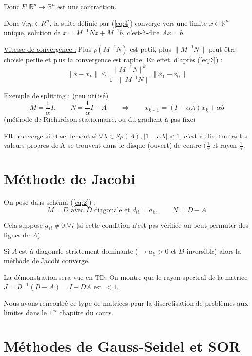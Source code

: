 \documentclass[a4paper,11pt]{article}
\newcommand{\R}{\mathbb{R}}
\theoremstyle{plain} %
\begin{document}
Donc $F : \R^n \rightarrow \R^n$ est une contraction.

Donc $\forall x_0 \in R^n$, la suite définie par (\ref{eq:4}) converge vers une limite $x \in \R^n$ unique, solution de $x = M^{-1}Nx+M^{-1}b$, c'est-à-dire $Ax=b$.

\vspace{1cm}
\underline{Vitesse de convergence :} Plus $\rho(M^{-1}N)$ est petit, plus $\|M^{-1}N\|$ peut être choisie petite et plus la convergence est rapide.
En effet, d'après (\ref{eq:3}) :
\[
    \|x-x_k\| \leq \frac{\|M^{-1}N\|^k}{1-\|M^{-1}N\|}\|x_1-x_0\|
\]

\vspace{1cm}
\underline{Exemple de splitting : } (peu utilisé)
\[
    M = \frac{1}{\alpha}I, \qquad N = \frac{1}{\alpha}I - A \qquad \Longrightarrow \qquad x_{k+1} = (I - \alpha A)x_k + \alpha b
\]
(méthode de Richardson stationnaire, ou du gradient à pas fixe)

Elle converge si et seulement si $\forall \lambda \in Sp(A), |1-\alpha \lambda | < 1$, c'est-à-dire toutes les valeurs propres de A se trouvent dans le disque (ouvert) de centre $(\frac{1}{\alpha}$ et rayon $\frac{1}{\alpha}$.

\section{Méthode de Jacobi}
On pose dans schéma (\ref{eq:2}) :
\[
    M = D \mbox{ avec $D$ diagonale et } d_{ii}=a_{ii}, \qquad N=D-A
\]

\begin{remark}
    Cela suppose $a_{ii} \ne 0 \; \forall i$ (si cette condition n'est pas vérifiée on peut permuter des lignes de $A$).
\end{remark}

\begin{ftheo}
    Si $A$ est à diagonale strictement dominante ($\rightarrow a_{ii}>0$ et $D$ inversible) alors la méthode de Jacobi converge.
\end{ftheo}

La démonstration sera vue en TD. On montre que le rayon spectral de la matrice $J = D^{-1}(D-A) = I - DA$ est $< 1$.

Nous avons rencontré ce type de matrices pour la discrétisation de problèmes aux limites dans le $1^{er}$ chapitre du cours.

\section{Méthodes de Gauss-Seidel et SOR}
\end{document}
